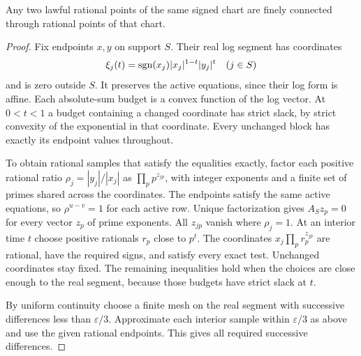 \begin{lemma}\label{lem:rational-chart}
Any two lawful rational points of the same signed chart are finely connected
through rational points of that chart.
\end{lemma}
\begin{proof}
Fix endpoints \(x,y\) on support \(S\). Their real log segment has coordinates
\[
 \xi_j(t)=\operatorname{sgn}(x_j)|x_j|^{1-t}|y_j|^t \quad(j\in S)
\]
and is zero outside \(S\). It preserves the active equations, since their
log form is affine. Each absolute-sum budget is a convex function of the
log vector. At \(0<t<1\) a budget containing a changed coordinate has
strict slack, by strict convexity of the exponential in that coordinate.
Every unchanged block has exactly its endpoint values throughout.

To obtain rational samples that satisfy the equalities exactly, factor
each positive rational ratio
\(\rho_j=|y_j|/|x_j|\) as \(\prod_p p^{z_{jp}}\), with integer exponents
and a finite set of primes shared across the coordinates. The endpoints
satisfy the same active equations, so \(\rho^{u-v}=1\) for each active
row. Unique factorization gives \(A_S z_p=0\) for every vector \(z_p\)
of prime exponents. All \(z_{jp}\) vanish where \(\rho_j=1\).
At an interior time \(t\) choose positive rationals \(r_p\) close to \(p^t\).
The coordinates \(x_j\prod_p r_p^{z_{jp}}\) are rational, have the
required signs, and satisfy every exact test. Unchanged coordinates stay
fixed. The remaining inequalities hold when the choices are close enough
to the real segment, because those budgets have strict slack at \(t\).

By uniform continuity choose a finite mesh on the real segment with
successive differences less than \(\varepsilon/3\). Approximate each
interior sample within \(\varepsilon/3\) as above and use the given
rational endpoints. This gives all required successive differences.
\end{proof}

